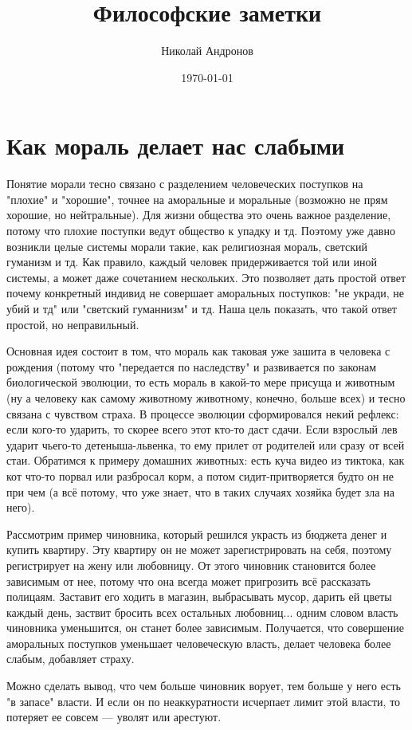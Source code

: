 \documentclass[a4paper,12pt]{article}
\author{Николай Андронов}
\title{Философские заметки}
\date{\today}
\begin{document}
\maketitle
\section{Как мораль делает нас слабыми}
Понятие морали тесно связано с разделением человеческих поступков на "плохие" и "хорошие", точнее на аморальные и моральные (возможно не прям хорошие, но нейтральные). Для жизни общества это очень важное разделение, потому что плохие поступки ведут общество к упадку и тд. Поэтому уже давно возникли целые системы морали такие, как религиозная мораль, светский гуманизм и тд. Как правило, каждый человек придерживается той или иной системы, а может даже сочетанием нескольких. Это позволяет дать простой ответ почему конкретный индивид не совершает аморальных поступков: "не укради, не убий и тд" или "светский гуманнизм" и тд. Наша цель показать, что такой ответ простой, но неправильный. 

Основная идея состоит в том, что мораль как таковая уже зашита в человека с рождения (потому что "передается по наследству" и развивается по законам биологической эволюции, то есть мораль в какой-то мере присуща и животным (ну а человеку как самому животному животному, конечно, больше всех) и тесно связана с чувством страха. В процессе эволюции сформировался некий рефлекс: если кого-то ударить, то скорее всего этот кто-то даст сдачи. Если взрослый лев ударит чьего-то детеныша-львенка, то ему прилет от родителей или сразу от всей стаи. Обратимся к примеру домашних животных: есть куча видео из тиктока, как кот что-то порвал или разбросал корм, а потом сидит-притворяется будто он не при чем (а всё потому, что уже знает, что в таких случаях хозяйка будет зла на него).

Рассмотрим пример чиновника, который решился украсть из бюджета денег и купить квартиру. Эту квартиру он не может зарегистрировать на себя, поэтому регистрирует на жену или любовницу. От этого чиновник становится более зависимым от нее, потому что она всегда может пригрозить всё рассказать полицаям. Заставит его ходить в магазин, выбрасывать мусор, дарить ей цветы каждый день, заствит бросить всех остальных любовниц... одним словом власть чиновника уменьшится, он станет более зависимым. Получается, что совершение аморальных поступков уменьшает человеческую власть, делает человека более слабым, добавляет страху. 

Можно сделать вывод, что чем больше чиновник ворует, тем больше у него есть "в запасе" власти. И если он по неаккуратности исчерпает лимит этой власти, то потеряет ее совсем --- уволят или арестуют. 
\end{document}
